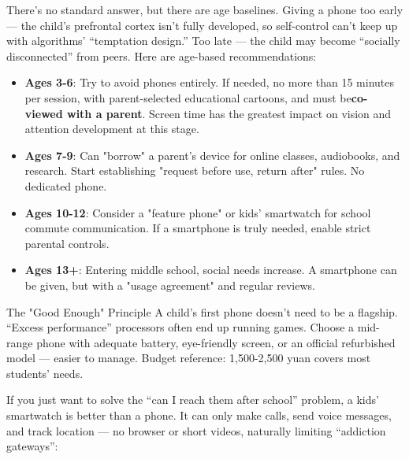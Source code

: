 


There's no standard answer, but there are age baselines. Giving a phone too early — the child's prefrontal cortex isn't fully developed, so self-control can't keep up with algorithms' “temptation design.” Too late — the child may become “socially disconnected” from peers. Here are age-based recommendations:

\begin{itemize}
  \item \textbf{Ages 3-6}: Try to avoid phones entirely. If needed, no more than 15 minutes per session, with parent-selected educational cartoons, and must be\textbf{co-viewed with a parent}. Screen time has the greatest impact on vision and attention development at this stage.
  \item \textbf{Ages 7-9}: Can "borrow" a parent's device for online classes, audiobooks, and research. Start establishing "request before use, return after" rules. No dedicated phone.
  \item \textbf{Ages 10-12}: Consider a "feature phone" or kids' smartwatch for school commute communication. If a smartphone is truly needed, enable strict parental controls.
  \item \textbf{Ages 13+}: Entering middle school, social needs increase. A smartphone can be given, but with a "usage agreement" and regular reviews.
\end{itemize}

\begin{tcbinfo}{The "Good Enough" Principle}
A child's first phone doesn't need to be a flagship. “Excess performance” processors often end up running games. Choose a mid-range phone with adequate battery, eye-friendly screen, or an official refurbished model — easier to manage. Budget reference: 1,500-2,500 yuan covers most students' needs.

\end{tcbinfo}


If you just want to solve the “can I reach them after school” problem, a kids' smartwatch is better than a phone. It can only make calls, send voice messages, and track location — no browser or short videos, naturally limiting “addiction gateways”:

